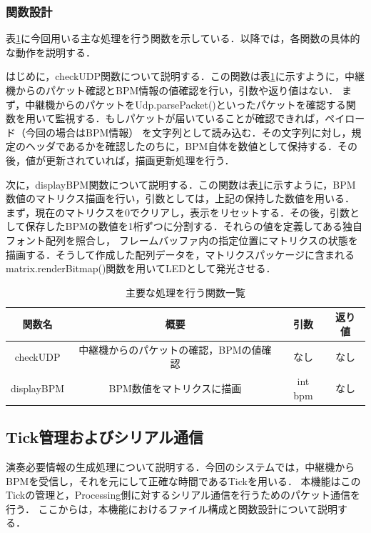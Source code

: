 \documentclass[lualatex,book,paper=a4paper,jafontsize=11.5pt,jafontscale=1.05]{jlreq}
\begin{document}
\subsubsection{関数設計}
表\ref{tab:func1}に今回用いる主な処理を行う関数を示している．以降では，各関数の具体的な動作を説明する．\par
はじめに，checkUDP関数について説明する．この関数は表\ref{tab:func1}に示すように，中継機からのパケット確認とBPM情報の値確認を行い，引数や返り値はない．
まず，中継機からのパケットをUdp.parsePacket()といったパケットを確認する関数を用いて監視する．もしパケットが届いていることが確認できれば，ペイロード（今回の場合はBPM情報）
を文字列として読み込む．その文字列に対し，規定のヘッダであるかを確認したのちに，BPM自体を数値として保持する．その後，値が更新されていれば，描画更新処理を行う．\par
次に，displayBPM関数について説明する．この関数は表\ref{tab:func1}に示すように，BPM数値のマトリクス描画を行い，引数としては，上記の保持した数値を用いる．
まず，現在のマトリクスを0でクリアし，表示をリセットする．その後，引数として保存したBPMの数値を1桁ずつに分割する．それらの値を定義してある独自フォント配列を照合し，
フレームバッファ内の指定位置にマトリクスの状態を描画する．そうして作成した配列データを，マトリクスパッケージに含まれるmatrix.renderBitmap()関数を用いてLEDとして発光させる．

\begin{table}[h]
    \vspace{-1em}
    \caption{主要な処理を行う関数一覧}
    \centering
    \label{tab:func1}
    \begin{tabular}{|c|c|c|c|}
    \hline
    関数名 & 概要 & 引数 &  返り値\\
    \hline
    checkUDP & 中継機からのパケットの確認，BPMの値確認 & なし & なし\\
    \hline
    displayBPM & BPM数値をマトリクスに描画 & int bpm & なし\\
    \hline
    \end{tabular}
\end{table}


\subsection{Tick管理およびシリアル通信}
演奏必要情報の生成処理について説明する．今回のシステムでは，中継機からBPMを受信し，それを元にして正確な時間であるTickを用いる．
本機能はこのTickの管理と，Processing側に対するシリアル通信を行うためのパケット通信を行う．
ここからは，本機能におけるファイル構成と関数設計について説明する．
\end{document}
